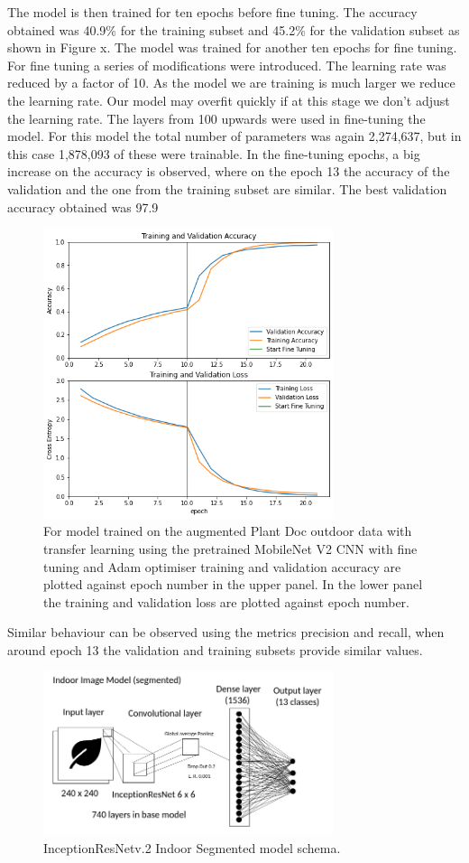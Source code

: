 \documentclass[conference]{IEEEtran}
\begin{document}
The model is then trained for ten epochs before fine tuning. The accuracy obtained was 40.9\% for the training subset and 45.2\% for the validation subset as shown in Figure x. The model was trained for another ten epochs for fine tuning. For fine tuning a series of modifications were introduced. The learning rate was reduced by a factor of 10. As the model we are training is much larger we reduce the learning rate. Our model may overfit quickly if at this stage we don’t adjust the learning rate. The layers from 100 upwards were used in fine-tuning the model. For this model the total number of parameters was again 2,274,637, but in this case 1,878,093 of these were trainable. In the fine-tuning epochs, a big increase on the accuracy is observed, where on the epoch 13 the accuracy of the validation and the one from the training subset are similar. The best validation accuracy obtained was 97.9%
\begin{figure}[htbp]
\centerline{\includegraphics[width=8.5cm]{ModelOutdoorsMobileNetEpochsAccuracychart_new.png}}
\caption{For model trained on the augmented Plant Doc outdoor data with transfer learning using the pretrained MobileNet V2 CNN with fine tuning and Adam optimiser training and validation accuracy are plotted against epoch number in the upper panel. In the lower panel the training and validation loss are plotted against epoch number.}
\label{fig}
\end{figure}

Similar behaviour can be observed using the metrics precision and recall, when around epoch 13 the validation and training subsets provide similar values.
 
\begin{figure}[htbp]
\centerline{\includegraphics[width=8.5cm]{ModelIndoorsResNet.png}}
\caption{InceptionResNetv.2 Indoor Segmented model schema.}
\label{fig}
\end{figure}
\end{document}
